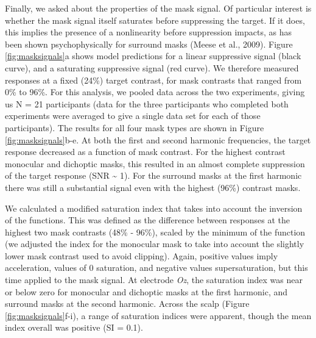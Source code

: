 \documentclass[]{article}
\begin{document}
Finally, we asked about the properties of the mask signal. Of particular interest is whether the mask signal itself saturates before suppressing the target. If it does, this implies the presence of a nonlinearity before suppression impacts, as has been shown psychophysically for surround masks (Meese et al., 2009). Figure \ref{fig:masksignals}a shows model predictions for a linear suppressive signal (black curve), and a saturating suppressive signal (red curve). We therefore measured responses at a fixed (24\%) target contrast, for mask contrasts that ranged from 0\% to 96\%. For this analysis, we pooled data across the two experiments, giving us N = 21 participants (data for the three participants who completed both experiments were averaged to give a single data set for each of those participants). The results for all four mask types are shown in Figure \ref{fig:masksignals}b-e. At both the first and second harmonic frequencies, the target response decreased as a function of mask contrast. For the highest contrast monocular and dichoptic masks, this resulted in an almost complete suppression of the target response (SNR \textasciitilde{} 1). For the surround masks at the first harmonic there was still a substantial signal even with the highest (96\%) contrast masks.

We calculated a modified saturation index that takes into account the inversion of the functions. This was defined as the difference between responses at the highest two mask contrasts (48\% - 96\%), scaled by the minimum of the function (we adjusted the index for the monocular mask to take into account the slightly lower mask contrast used to avoid clipping). Again, positive values imply acceleration, values of 0 saturation, and negative values supersaturation, but this time applied to the mask signal. At electrode \emph{Oz}, the saturation index was near or below zero for monocular and dichoptic masks at the first harmonic, and surround masks at the second harmonic. Across the scalp (Figure \ref{fig:masksignals}f-i), a range of saturation indices were apparent, though the mean index overall was positive (SI = 0.1).
\end{document}
